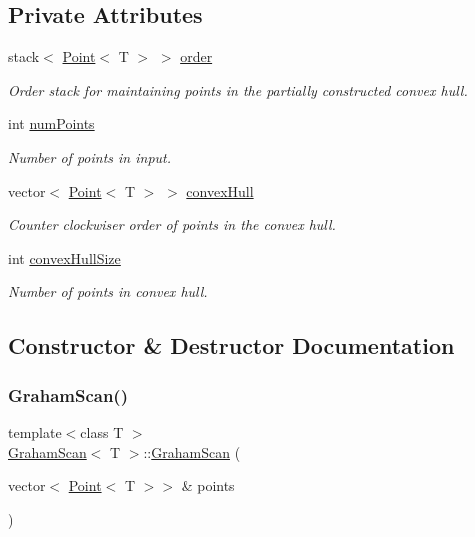 \subsection*{Private Attributes}
\begin{DoxyCompactItemize}
\item 
stack$<$ \mbox{\hyperlink{classPoint}{Point}}$<$ T $>$ $>$ \mbox{\hyperlink{classGrahamScan_a586a222b7f2127410d9e20fda19c64d3}{order}}
\begin{DoxyCompactList}\small\item\em Order stack for maintaining points in the partially constructed convex hull. \end{DoxyCompactList}\item 
int \mbox{\hyperlink{classGrahamScan_a4769bbdb7caacde8c368a0074fccef19}{num\+Points}}
\begin{DoxyCompactList}\small\item\em Number of points in input. \end{DoxyCompactList}\item 
vector$<$ \mbox{\hyperlink{classPoint}{Point}}$<$ T $>$ $>$ \mbox{\hyperlink{classGrahamScan_a7d93b90073f5d60d142f8470ac8bf714}{convex\+Hull}}
\begin{DoxyCompactList}\small\item\em Counter clockwiser order of points in the convex hull. \end{DoxyCompactList}\item 
int \mbox{\hyperlink{classGrahamScan_a5d428a11cebb2ff2f9e91d2644d7d0c5}{convex\+Hull\+Size}}
\begin{DoxyCompactList}\small\item\em Number of points in convex hull. \end{DoxyCompactList}\end{DoxyCompactItemize}


\subsection{Constructor \& Destructor Documentation}
\mbox{\label{classGrahamScan_af518504ce673b75e7bef7a0de90e7699}} 
\subsubsection{\texorpdfstring{Graham\+Scan()}{GrahamScan()}}
{\footnotesize\ttfamily template$<$class T $>$ \\
\mbox{\hyperlink{classGrahamScan}{Graham\+Scan}}$<$ T $>$\+::\mbox{\hyperlink{classGrahamScan}{Graham\+Scan}} (\begin{DoxyParamCaption}\item[{vector$<$ \mbox{\hyperlink{classPoint}{Point}}$<$ T $>$$>$ \&}]{points }\end{DoxyParamCaption})}



